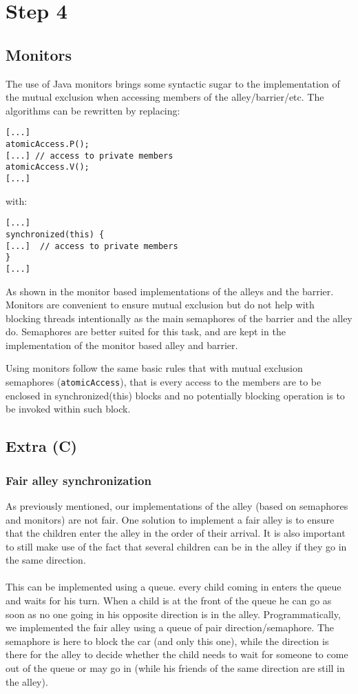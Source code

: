 
\section{Step 4}

\subsection{Monitors} %

The use of Java monitors brings some syntactic sugar to the implementation of
the mutual exclusion when accessing members of the alley/barrier/etc. The
algorithms can be rewritten by replacing:
\begin{verbatim}
[...]
atomicAccess.P();
[...] // access to private members
atomicAccess.V();
[...]
\end{verbatim}
with:
\begin{verbatim}
[...]
synchronized(this) {
[...]  // access to private members
}
[...]
\end{verbatim}

As shown in the monitor based implementations of the alleys and the barrier.
Monitors are convenient to ensure mutual exclusion but do not help with blocking
threads intentionally as the main semaphores of the barrier and the alley do.
Semaphores are better suited for this task, and are kept in the implementation
of the monitor based alley and barrier.

Using monitors follow the same basic rules that with mutual exclusion semaphores
(\texttt{atomicAccess}), that is every access to the members are to be enclosed
in synchronized(this) blocks and no potentially blocking operation is to be
invoked within such block.


\subsection{Extra (C)} %
\subsubsection{Fair alley synchronization}

As previously mentioned, our implementations of the alley (based on semaphores
and monitors) are not fair. One solution to implement a fair alley is to ensure
that the children enter the alley in the order of their arrival. It is also
important to still make use of the fact that several children can be in the
alley if they go in the same direction.\\
        ~\\
This can be implemented using a queue. every child coming in enters the queue
and waits for his turn. When a child is at the front of the queue he can go as
soon as no one going in his opposite direction is in the alley.
Programmatically, we implemented the fair alley using a queue of pair
direction/semaphore. The semaphore is here to block the car (and only this
one), while the direction is there for the alley to decide whether the
child needs to wait for someone to come out of the queue or may go in (while
his friends of the same direction are still in the alley).

